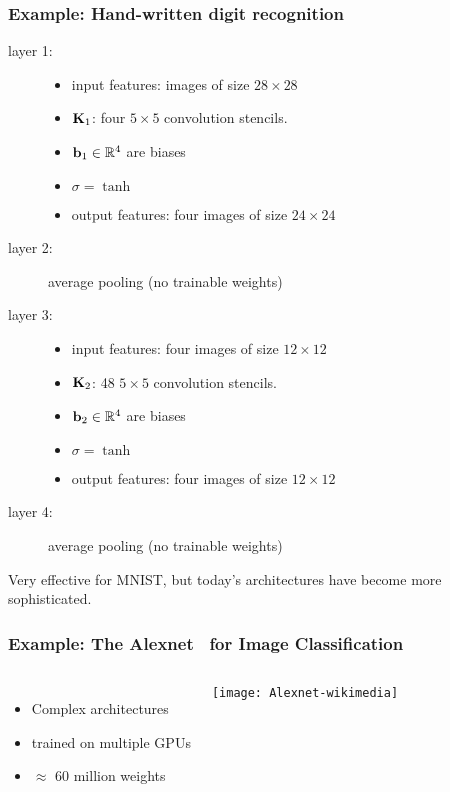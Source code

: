 \documentclass[12pt,fleqn]{beamer}
\begin{document}
\begin{frame}
	\frametitle{Example: Hand-written digit recognition~\cite{LeCun1990}}
	
	\begin{description}
		\item[layer 1:] 
			\begin{itemize}
				\item input features: images of size $28 \times 28$
				\item ${\bf K}_1$: four $5\times5$ convolution stencils.
				\item ${\bf b}_1 \in \mathbb{R}^4$ are biases
				\item $\sigma = \tanh$
				\item output features: four images of size $24\times 24$				
			\end{itemize}
		\item[layer 2:] average pooling (no trainable weights)
		\item[layer 3:] 
			\begin{itemize}
				\item input features: four images of size $12 \times 12$
				\item ${\bf K}_2$: 48 $5\times5$ convolution stencils.
				\item ${\bf b}_2 \in \mathbb{R}^4$ are biases
				\item $\sigma = \tanh$
				\item output features: four images of size $12\times 12$				
			\end{itemize}
		\item[layer 4:] average pooling (no trainable weights)
	\end{description}
	
	\bigskip
	\pause
	
	Very effective for MNIST, but today's architectures have become more sophisticated.
	
\end{frame}

\begin{frame}\frametitle{Example: The Alexnet~\cite{KrizhevskySutskeverHinton2012} for Image Classification}

\begin{columns}
	\begin{itemize}
		\item Complex architectures 
		\item trained on multiple GPUs
		\item $\approx $ 60 million weights
	\end{itemize}	
\begin{center}
\texttt{[image: Alexnet-wikimedia]}
\end{center}
\end{columns}
\end{frame}
\end{document}
